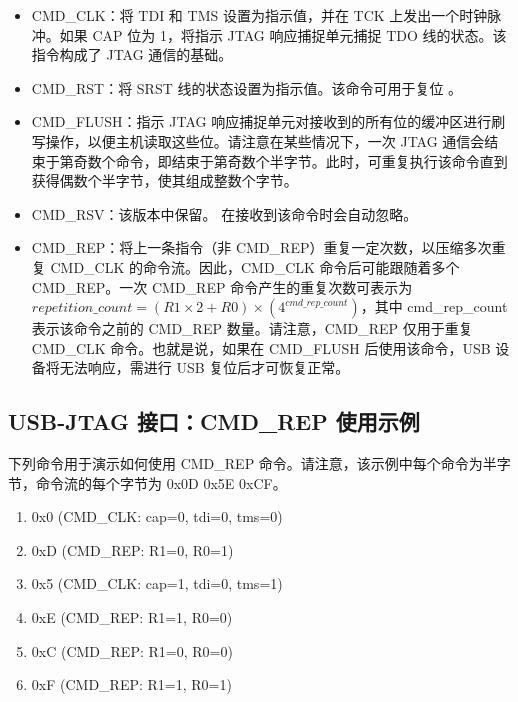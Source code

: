 \documentclass[main\_\_CN.tex]{subfiles}
\begin{document}
\begin{itemize}
\item CMD\_CLK：将 TDI 和 TMS 设置为指示值，并在 TCK 上发出一个时钟脉冲。如果 CAP 位为 1，将指示 JTAG 响应捕捉单元捕捉 TDO 线的状态。该指令构成了 JTAG 通信的基础。

\item CMD\_RST：将 SRST 线的状态设置为指示值。该命令可用于复位 \chipname{}。

\item CMD\_FLUSH：指示 JTAG 响应捕捉单元对接收到的所有位的缓冲区进行刷写操作，以便主机读取这些位。请注意在某些情况下，一次 JTAG 通信会结束于第奇数个命令，即结束于第奇数个半字节。此时，可重复执行该命令直到获得偶数个半字节，使其组成整数个字节。

\item CMD\_RSV：该版本中保留。\chipname{} 在接收到该命令时会自动忽略。

\item CMD\_REP：将上一条指令（非 CMD\_REP）重复一定次数，以压缩多次重复 CMD\_CLK 的命令流。因此，CMD\_CLK 命令后可能跟随着多个 CMD\_REP。一次 CMD\_REP 命令产生的重复次数可表示为 \begin{math}repetition\_count = (R1 \times 2 + R0) \times (4^{cmd\_rep\_count})\end{math}，其中 cmd\_rep\_count 表示该命令之前的 CMD\_REP 数量。请注意，CMD\_REP 仅用于重复 CMD\_CLK 命令。也就是说，如果在 CMD\_FLUSH 后使用该命令，USB 设备将无法响应，需进行 USB 复位后才可恢复正常。
\end{itemize}

\subsection{USB-JTAG 接口：CMD\_REP 使用示例}    

下列命令用于演示如何使用 CMD\_REP 命令。请注意，该示例中每个命令为半字节，命令流的每个字节为 0x0D 0x5E 0xCF。

\begin{enumerate}
\item 0x0 (CMD\_CLK: cap=0, tdi=0, tms=0)
\item 0xD (CMD\_REP: R1=0, R0=1)
\item 0x5 (CMD\_CLK: cap=1, tdi=0, tms=1)
\item 0xE (CMD\_REP: R1=1, R0=0)
\item 0xC (CMD\_REP: R1=0, R0=0)
\item 0xF (CMD\_REP: R1=1, R0=1)
\end{enumerate}
\end{document}
